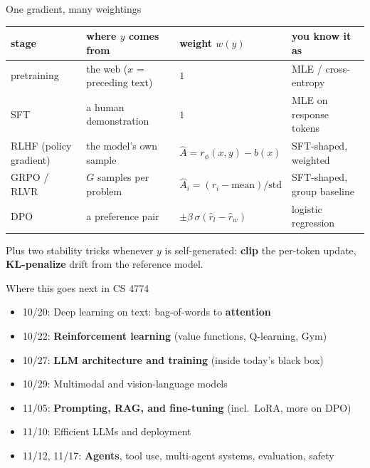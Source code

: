 \begin{frame}{One gradient, many weightings}
\vspace{4pt}
\centering\footnotesize
\renewcommand{\arraystretch}{1.35}\setlength{\tabcolsep}{3pt}
\begin{tabular}{@{}llll@{}}
\toprule
\textbf{stage} & \textbf{where $y$ comes from} & \textbf{weight $w(y)$} & \textbf{you know it as}\\
\midrule
pretraining & the web ($x$ = preceding text) & $1$ & MLE / cross-entropy\\
SFT & a human demonstration & $1$ & MLE on response tokens\\
RLHF (policy gradient) & the model's own sample & $\hat A = r_\phi(x,y) - b(x)$ & SFT-shaped, weighted\\
GRPO / RLVR & $G$ samples per problem & $\hat A_i = (r_i - \text{mean})/\text{std}$ & SFT-shaped, group baseline\\
DPO & a preference pair & $\pm\beta\,\sigma(\hat r_l - \hat r_w)$ & logistic regression\\
\bottomrule
\end{tabular}
\vspace{8pt}

\small Plus two stability tricks whenever $y$ is self-generated: \textbf{clip} the per-token update, \textbf{KL-penalize} drift from the reference model.
\end{frame}

\begin{frame}{Where this goes next in CS 4774}
\begin{itemize}\setlength{\itemsep}{7pt}
  \item 10/20: Deep learning on text: bag-of-words to \textbf{attention}
  \item 10/22: \textbf{Reinforcement learning} (value functions, Q-learning, Gym)
  \item 10/27: \textbf{LLM architecture and training} (inside today's black box)
  \item 10/29: Multimodal and vision-language models
  \item 11/05: \textbf{Prompting, RAG, and fine-tuning} (incl.\ LoRA, more on DPO)
  \item 11/10: Efficient LLMs and deployment
  \item 11/12, 11/17: \textbf{Agents}, tool use, multi-agent systems, evaluation, safety
\end{itemize}
\end{frame}

